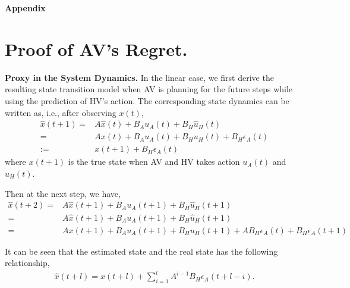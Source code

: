 {\Large \textbf{Appendix}} 

\section{Proof of AV's Regret.} \label{app:av}
{\bf Proxy in the System Dynamics.} In the linear case, we first derive the resulting state transition model when AV is planning for the future steps while using the prediction of HV's action.
The corresponding state dynamics can be written as, i.e., after observing $x(t)$,
\begin{align*}
    \hat{x}(t+1) =& A\hat{x}(t) + B_Au_A(t)+B_H\hat{u}_H(t)\\
    =& A{x}(t) + B_Au_A(t)+B_H{u}_H(t) + B_H\epsilon_A(t)\\
    :=& x(t+1) + B_H\epsilon_A(t)
\end{align*}
where $x(t+1)$ is the true state when AV and HV takes action $u_A(t)$ and $u_H(t)$.

Then at the next step, we have,
\begin{align*}
     \hat{x}(t+2) =& A\hat{x}(t+1) + B_Au_A(t+1)+B_H\hat{u}_H(t+1)\\
     = & A\hat{x}(t+1) + B_Au_A(t+1)+B_H\hat{u}_H(t+1)\\
     = & Ax(t+1) +B_Au_A(t+1)+B_H{u}_H(t+1) + AB_H\epsilon_A(t) + B_H\epsilon_A(t+1)
\end{align*}

It can be seen that the estimated state and the real state has the following relationship,
\begin{align}
    \hat{x}(t+l) = x(t+l) + \sum_{i=1}^{l}A^{i-1}B_H\epsilon_A(t+l-i). \label{eqn:app:proxymodel}
\end{align}

